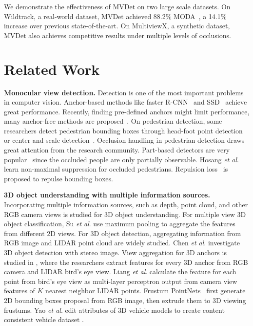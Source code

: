 \documentclass[runningheads]{llncs}
\newcommand{\etal}{\textit{et al}. }
\begin{document}
We demonstrate the effectiveness of MVDet on two large scale datasets. On Wildtrack, a real-world dataset, MVDet achieved 88.2\% MODA~\cite{kasturi2008framework}, a 14.1\% increase over previous state-of-the-art. On MultiviewX, a synthetic dataset, MVDet also achieves competitive results under multiple levels of occlusions. 




\section{Related Work}
\label{sec:related}

\textbf{Monocular view detection.} 
Detection is one of the most important problems in computer vision. 
Anchor-based methods like faster R-CNN~\cite{ren2015faster} and SSD~\cite{liu2016ssd} achieve great performance. Recently, finding pre-defined anchors might limit performance, many anchor-free methods are proposed~\cite{zhu2019feature,tian2019fcos,kong2019foveabox,yang2018metaanchor,duan2019centernet,law2018cornernet}.
On pedestrian detection, 
some researchers detect pedestrian bounding boxes through head-foot point detection~\cite{song2018small} or center and scale detection~\cite{liu2019high}. Occlusion handling in pedestrian detection draws great attention from the research community. 
Part-based detectors are very popular~\cite{ouyang2015partial,tian2015deep,noh2018improving,zhang2018occlusion} since the occluded people are only partially observable. 
Hosang \etal \cite{hosang2017learning} learn non-maximal suppression for occluded pedestrians. 
Repulsion loss~\cite{wang2018repulsion} is proposed to repulse bounding boxes. 

\textbf{3D object understanding with multiple information sources.} 
Incorporating multiple information sources, such as depth, point cloud, and other RGB camera views is studied for 3D object understanding. 
For multiple view 3D object classification, Su \etal \cite{su2015multi} use maximum pooling to aggregate the features from different 2D views. 
For 3D object detection, aggregating information from RGB image and LIDAR point cloud are widely studied. Chen \etal \cite{chen20153d} investigate 3D object detection with stereo image. 
View aggregation for 3D anchors is studied in \cite{ku2018joint}, where the researchers extract features for every 3D anchor from RGB camera and LIDAR bird's eye view. Liang \etal \cite{liang2018deep} calculate the feature for each point from bird's eye view as multi-layer perceptron output from camera view features of $K$ nearest neighbor LIDAR points. Frustum PointNets~\cite{qi2018frustum} first generate 2D bounding boxes proposal from RGB image, then extrude them to 3D viewing frustums. 
Yao \etal edit attributes of 3D vehicle models to create content consistent vehicle dataset \cite{yao2019simulating}.
\end{document}
